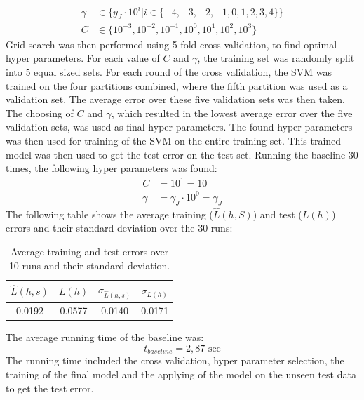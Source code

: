 \documentclass{article}
\begin{document}
\begin{align}
\gamma &\in \lbrace y_J \cdot 10^i | i \in \lbrace -4,-3,-2,-1,0,1,2,3,4 \rbrace \rbrace  \\
C &\in \lbrace 10^{-3}, 10^{-2}, 10^{-1}, 10^0, 10^1, 10^2, 10^3 \rbrace
\end{align}
Grid search was then performed using 5-fold cross validation, to find optimal hyper parameters. For each value of $C$ and $\gamma$, the training set was randomly split into 5 equal sized sets. For each round of the cross validation, the SVM was trained on the four partitions combined, where the fifth partition was used as a validation set. The average error over these five validation sets was then taken. The choosing of $C$ and $\gamma$, which resulted in the lowest average error over the five validation sets, was used as final hyper parameters. The found hyper parameters was then used for training of the SVM on the entire training set. This trained model was then used to get the test error on the test set. Running the baseline 30 times, the following hyper parameters was found:
\begin{align*}
C &= 10^1 = 10 \\
\gamma &= \gamma_J \cdot 10^0 = \gamma_J
\end{align*}
The following table shows the average training ($\hat{L}(h,S)$) and test ($L(h)$) errors and their standard deviation over the 30 runs:
\begin{table}[H]
\centering
\caption{Average training and test errors over 10 runs and their standard deviation.}
    \begin{tabular}{|c|c|c|c|}
        \hline
        $\hat{L}(h,s)$ & $L(h)$ & $\sigma_{\hat{L}(h,s)}$ & $\sigma_{L(h)}$ \\ \hline
        0.0192 & 0.0577 & 0.0140  & 0.0171 \\ \hline
    \end{tabular}
\end{table}
The average running time of the baseline was:
\begin{equation}
t_{baseline} = 2,87 \text{ sec}
\end{equation}
The running time included the cross validation, hyper parameter selection, the training of the final model and the applying of the model on the unseen test data to get the test error. \\ \\
\end{document}
